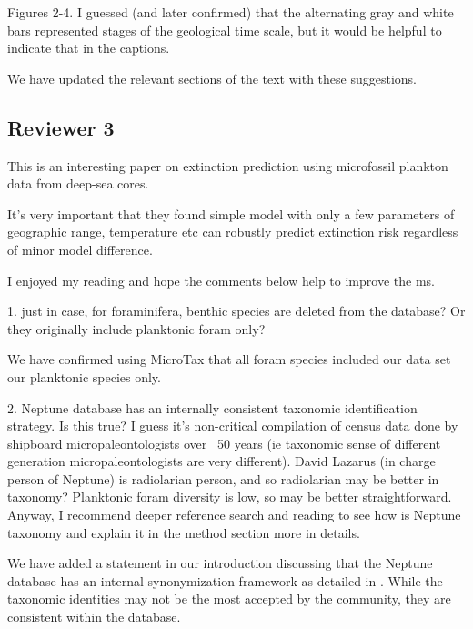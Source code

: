 \documentclass[12pt,letterpaper]{article}
\begin{document}
\begin{refsection}
\begin{bfseries}
  Figures 2-4. I guessed (and later confirmed) that the alternating gray and white bars represented stages of the geological time scale, but it would be helpful to indicate that in the captions.
\end{bfseries}

We have updated the relevant sections of the text with these suggestions.

\subsection{Reviewer 3}

\begin{bfseries}
  This is an interesting paper on extinction prediction using microfossil plankton data from deep-sea cores.

  It’s very important that they found simple model with only a few parameters of geographic range, temperature etc can robustly predict extinction risk regardless of minor model difference.

  I enjoyed my reading and hope the comments below help to improve the ms.

  1. just in case, for foraminifera, benthic species are deleted from the database? Or they originally include planktonic foram only?
\end{bfseries}

We have confirmed using MicroTax that all foram species included our data set our planktonic species only.

\begin{bfseries}
  2. Neptune database has an internally consistent taxonomic identification strategy. Is this true? I guess it’s non-critical compilation of census data done by shipboard micropaleontologists over ~50 years (ie taxonomic sense of different generation micropaleontologists are very different). David Lazarus (in charge person of Neptune) is radiolarian person, and so radiolarian may be better in taxonomy? Planktonic foram diversity is low, so may be better straightforward. Anyway, I recommend deeper reference search and reading to see how is Neptune taxonomy and explain it in the method section more in details.
\end{bfseries}

We have added a statement in our introduction discussing that the Neptune database has an internal synonymization framework as detailed in \citet{Lazarus1994}. While the taxonomic identities may not be the most accepted by the community, they are consistent within the database.


\end{refsection}
\end{document}
